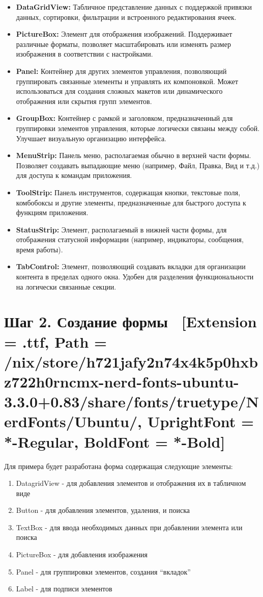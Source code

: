 \documentclass[12pt]{article}
\newcommand{\icon}[1]{\fontspec{UbuntuNerdFont}[Extension = .ttf,
  Path = /nix/store/h721jafy2n74x4k5p0hxbz722h0rncmx-nerd-fonts-ubuntu-3.3.0+0.83/share/fonts/truetype/NerdFonts/Ubuntu/,
  UprightFont = *-Regular,
BoldFont = *-Bold] #1}
\newcommand{\iicon}[1]{{\icon{#1}}}
\renewcommand{\texttt}[1]{{\small\ttfamily #1}}
\numberwithin{listing}{section}
\numberwithin{figure}{section}
\begin{document}
\begin{itemize}
	\item \textbf{\texttt{DataGridView:}}
	      Табличное представление данных с поддержкой привязки данных, сортировки, фильтрации и встроенного редактирования ячеек.
	\item \textbf{\texttt{PictureBox:}}
	      Элемент для отображения изображений. Поддерживает различные форматы, позволяет масштабировать или изменять размер изображения в соответствии с настройками.
	\item \textbf{\texttt{Panel:}}
	      Контейнер для других элементов управления, позволяющий группировать связанные элементы и управлять их компоновкой. Может использоваться для создания сложных макетов или динамического отображения или скрытия групп элементов.
	\item \textbf{\texttt{GroupBox:}}
	      Контейнер с рамкой и заголовком, предназначенный для группировки элементов управления, которые логически связаны между собой. Улучшает визуальную организацию интерфейса.
	\item \textbf{\texttt{MenuStrip:}}
	      Панель меню, располагаемая обычно в верхней части формы. Позволяет создавать выпадающие меню (например, Файл, Правка, Вид и т.д.) для доступа к командам приложения.
	\item \textbf{\texttt{ToolStrip:}}
	      Панель инструментов, содержащая кнопки, текстовые поля, комбобоксы и другие элементы, предназначенные для быстрого доступа к функциям приложения.
	\item \textbf{\texttt{StatusStrip:}}
	      Элемент, располагаемый в нижней части формы, для отображения статусной информации (например, индикаторы, сообщения, время работы).
	\item \textbf{\texttt{TabControl:}}
	      Элемент, позволяющий создавать вкладки для организации контента в пределах одного окна. Удобен для разделения функциональности на логически связанные секции.
\end{itemize}

\newpage

\section{Шаг 2. Создание формы \ \texorpdfstring{{\small{\iicon{}}}}{}}
Для примера будет разработана форма содержащая следующие элементы:
\begin{enumerate}
	\item DatagridView - для добавления элементов и отображения их в табличном виде
	\item Button - для добавления элементов, удаления, и поиска
	\item TextBox - для ввода необходимых данных при добавлении элемента или поиска
	\item PictureBox - для добавления изображения
	\item Panel - для группировки элементов, создания “вкладок”
	\item Label - для подписи элементов
\end{enumerate}
\end{document}
